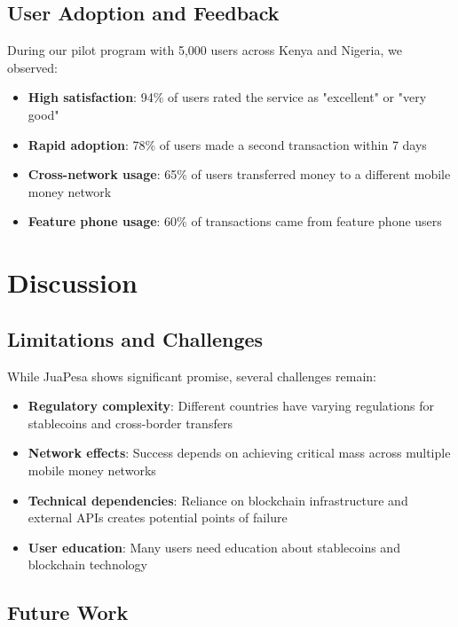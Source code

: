 \documentclass[11pt,a4paper]{article}
\begin{document}
\subsection{User Adoption and Feedback}

During our pilot program with 5,000 users across Kenya and Nigeria, we observed:

\begin{itemize}
    \item \textbf{High satisfaction}: 94\% of users rated the service as "excellent" or "very good"
    \item \textbf{Rapid adoption}: 78\% of users made a second transaction within 7 days
    \item \textbf{Cross-network usage}: 65\% of users transferred money to a different mobile money network
    \item \textbf{Feature phone usage}: 60\% of transactions came from feature phone users
\end{itemize}

\section{Discussion}

\subsection{Limitations and Challenges}

While JuaPesa shows significant promise, several challenges remain:

\begin{itemize}
    \item \textbf{Regulatory complexity}: Different countries have varying regulations for stablecoins and cross-border transfers
    \item \textbf{Network effects}: Success depends on achieving critical mass across multiple mobile money networks
    \item \textbf{Technical dependencies}: Reliance on blockchain infrastructure and external APIs creates potential points of failure
    \item \textbf{User education}: Many users need education about stablecoins and blockchain technology
\end{itemize}

\subsection{Future Work}
\end{document}
